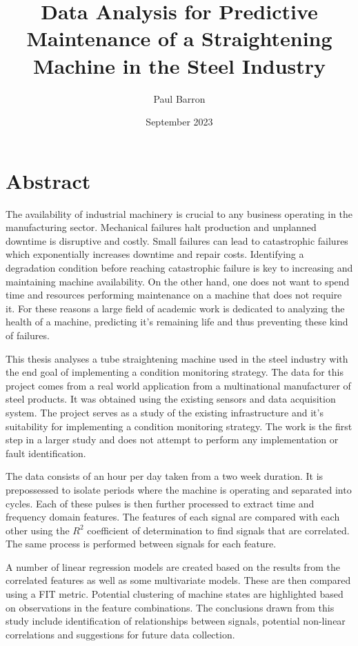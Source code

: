 \documentclass{article}
\title{Data Analysis for Predictive Maintenance of a Straightening Machine in the Steel Industry}
\date{September 2023}
\author{Paul Barron}
\begin{document}
\maketitle
\newpage
{}
\tableofcontents
\newpage

\section{Abstract}
The availability of industrial machinery  is crucial to any business operating in the manufacturing sector. Mechanical failures halt production and unplanned downtime is disruptive and costly. Small failures can lead to catastrophic failures which exponentially increases downtime and repair costs. Identifying a degradation condition before reaching catastrophic failure is key to increasing and maintaining machine availability. On the other hand, one does not want to spend time and resources performing maintenance on a machine that does not require it. For these reasons a large field of academic work is dedicated to analyzing the health of a machine, predicting it's remaining life and thus preventing these kind of failures.

This thesis analyses a tube straightening machine used in the steel industry with the end goal of implementing a condition monitoring strategy. The data for this project comes from a real world application from a multinational manufacturer of steel products. It was obtained using the existing sensors and data acquisition system. The project serves as a study of the existing infrastructure and it's suitability for implementing a condition monitoring strategy. The work is the first step in a larger study and does not attempt to perform any implementation or fault identification.

The data consists of an hour per day taken from a two week duration. It is prepossessed to isolate periods where the machine is operating and separated into cycles. Each of these pulses is then further processed to extract time and frequency domain features. The features of each signal are compared with each other using the $R^{2}$ coefficient of determination to find signals that are correlated. The same process is performed between signals for each feature. 

A number of linear regression models are created based on the results from the correlated features as well as some multivariate models. These are then compared using a FIT metric. Potential clustering of machine states are highlighted based on observations in the feature combinations. The conclusions drawn from this study include identification of relationships between signals, potential non-linear correlations and suggestions for future data collection.
\clearpage
\end{document}
